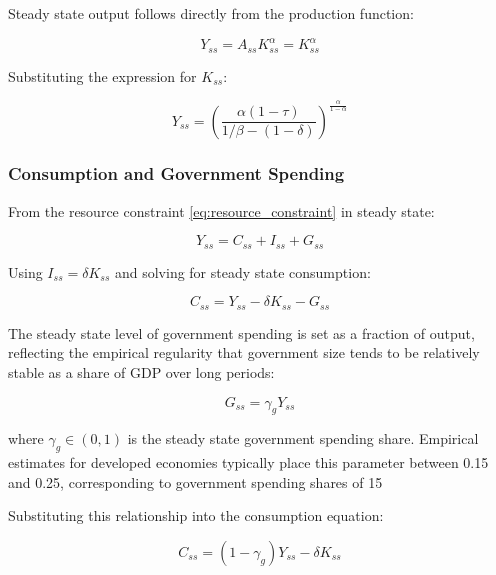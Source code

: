 \documentclass[5p,authoryear]{elsarticle}
\begin{document}
Steady state output follows directly from the production function:

\begin{equation}
Y_{ss} = A_{ss} K_{ss}^{\alpha} = K_{ss}^{\alpha}
\label{eq:ss_output}
\end{equation}

Substituting the expression for $K_{ss}$:

\begin{equation}
Y_{ss} = \left( \frac{\alpha(1-\tau)}{1/\beta - (1-\delta)} \right)^{\frac{\alpha}{1-\alpha}}
\label{eq:ss_output_detailed}
\end{equation}

\subsubsection{Consumption and Government Spending}

From the resource constraint \eqref{eq:resource_constraint} in steady state:

\begin{equation}
Y_{ss} = C_{ss} + I_{ss} + G_{ss}
\label{eq:ss_resource}
\end{equation}

Using $I_{ss} = \delta K_{ss}$ and solving for steady state consumption:

\begin{equation}
C_{ss} = Y_{ss} - \delta K_{ss} - G_{ss}
\label{eq:ss_consumption}
\end{equation}

The steady state level of government spending is set as a fraction of output, reflecting the empirical regularity that government size tends to be relatively stable as a share of GDP over long periods:

\begin{equation}
G_{ss} = \gamma_g Y_{ss}
\label{eq:ss_government_spending}
\end{equation}

where $\gamma_g \in (0,1)$ is the steady state government spending share. Empirical estimates for developed economies typically place this parameter between 0.15 and 0.25, corresponding to government spending shares of 15%

Substituting this relationship into the consumption equation:

\begin{equation}
C_{ss} = (1 - \gamma_g) Y_{ss} - \delta K_{ss}
\label{eq:ss_consumption_detailed}
\end{equation}
\end{document}
